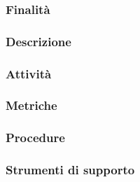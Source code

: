 \documentclass[../../norme-di-progetto.tex]{subfiles}
\begin{document}
\subsubsection{Finalità}%
\label{subs:revisione/finalita}

\subsubsection{Descrizione}%
\label{subs:revisione/descrizione}

\subsubsection{Attività}%
\label{subs:revisione/attivita}


\subsubsection{Metriche}%
\label{subs:revisione/metriche}

\subsubsection{Procedure}%
\label{subs:revisione/procedure}

\subsubsection{Strumenti di supporto}%
\label{subs:revisione/strumenti_di_supporto}
\end{document}

